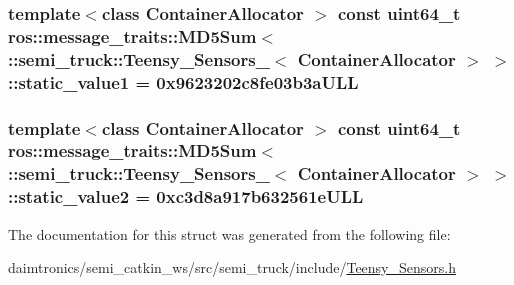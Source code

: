 \subsubsection[{\texorpdfstring{static\+\_\+value1}{static_value1}}]{\setlength{\rightskip}{0pt plus 5cm}template$<$class Container\+Allocator $>$ const uint64\+\_\+t ros\+::message\+\_\+traits\+::\+M\+D5\+Sum$<$ \+::{\bf semi\+\_\+truck\+::\+Teensy\+\_\+\+Sensors\+\_\+}$<$ Container\+Allocator $>$ $>$\+::static\+\_\+value1 = 0x9623202c8fe03b3a\+U\+LL\hspace{0.3cm}{\ttfamily [static]}}\hypertarget{structros_1_1message__traits_1_1_m_d5_sum_3_01_1_1semi__truck_1_1_teensy___sensors___3_01_container_allocator_01_4_01_4_ac249bb869c2dce4811f8a8eb56cc4cef}{}\label{structros_1_1message__traits_1_1_m_d5_sum_3_01_1_1semi__truck_1_1_teensy___sensors___3_01_container_allocator_01_4_01_4_ac249bb869c2dce4811f8a8eb56cc4cef}
\subsubsection[{\texorpdfstring{static\+\_\+value2}{static_value2}}]{\setlength{\rightskip}{0pt plus 5cm}template$<$class Container\+Allocator $>$ const uint64\+\_\+t ros\+::message\+\_\+traits\+::\+M\+D5\+Sum$<$ \+::{\bf semi\+\_\+truck\+::\+Teensy\+\_\+\+Sensors\+\_\+}$<$ Container\+Allocator $>$ $>$\+::static\+\_\+value2 = 0xc3d8a917b632561e\+U\+LL\hspace{0.3cm}{\ttfamily [static]}}\hypertarget{structros_1_1message__traits_1_1_m_d5_sum_3_01_1_1semi__truck_1_1_teensy___sensors___3_01_container_allocator_01_4_01_4_a58416065aee723162e985d3e3cba2ee1}{}\label{structros_1_1message__traits_1_1_m_d5_sum_3_01_1_1semi__truck_1_1_teensy___sensors___3_01_container_allocator_01_4_01_4_a58416065aee723162e985d3e3cba2ee1}


The documentation for this struct was generated from the following file\+:\begin{DoxyCompactItemize}
\item 
daimtronics/semi\+\_\+catkin\+\_\+ws/src/semi\+\_\+truck/include/\hyperlink{_teensy___sensors_8h}{Teensy\+\_\+\+Sensors.\+h}\end{DoxyCompactItemize}
